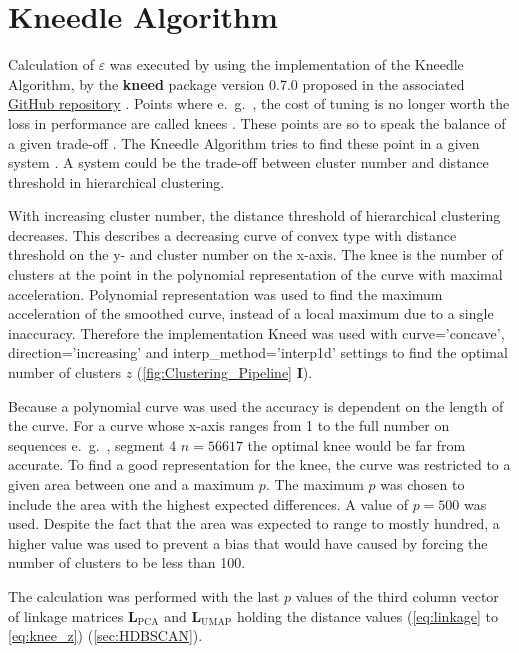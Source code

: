 \section{Kneedle Algorithm} \label{sec:Kneedle}

Calculation of $\varepsilon$ was executed by using the implementation of the Kneedle Algorithm, by the \textbf{kneed} package version 0.7.0 proposed in the associated \href{https://github.com/arvkevi/kneed.git}{GitHub repository} \autocite{satopaa_finding_2011}. Points where e.~g.~, the cost of tuning is no longer worth the loss in performance are called \glqq knees\grqq{} \autocite{satopaa_finding_2011}. These points are so to speak the balance of a given trade-off \autocite{satopaa_finding_2011}. The Kneedle Algorithm tries to find these point in a given system \autocite{satopaa_finding_2011}. A system could be the trade-off between cluster number and distance threshold in hierarchical clustering. %

With increasing cluster number, the distance threshold of hierarchical clustering decreases. This describes a decreasing curve of convex type with distance threshold on the y- and cluster number on the x-axis. The knee is the number of clusters at the point in the polynomial representation of the curve with maximal acceleration. Polynomial representation was used to find the maximum acceleration of the smoothed curve, instead of a local maximum due to a single inaccuracy. Therefore the implementation Kneed was used with \colorbox{backcolour}{curve='concave'}, \colorbox{backcolour}{direction='increasing'} and \colorbox{backcolour}{interp\_method='interp1d'} settings to find the optimal number of clusters $z$ (\autoref{fig:Clustering_Pipeline} \textsf{\textbf{I}}).

Because a polynomial curve was used the accuracy is dependent on the length of the curve. For a curve whose x-axis ranges from 1 to the full number on sequences e.~g.~, segment 4 $n=56617$ the optimal knee would be far from accurate. To find a good representation for the knee, the curve was restricted to a given area between one and a maximum $p$. The maximum $p$ was chosen to include the area with the highest expected differences. A value of $p=500$ was used. Despite the fact that the area was expected to range to mostly hundred, a higher value was used to prevent a bias that would have caused by forcing the number of clusters to be less than 100.

The calculation was performed with the last $p$ values of the third column vector of linkage matrices $\mathbf{L}_{\text{PCA}}$ and $\mathbf{L}_{\text{UMAP}}$ holding the distance values (\autoref{eq:linkage} to \autoref{eq:knee_z}) (\autoref{sec:HDBSCAN}).


